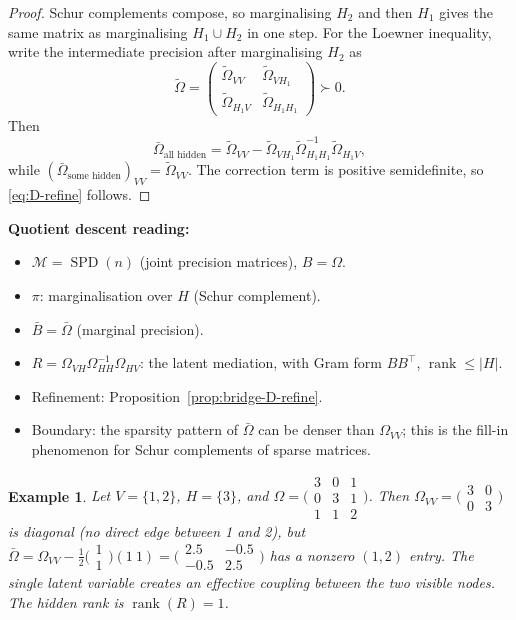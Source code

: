 \documentclass[11pt,a4paper]{article}
\numberwithin{equation}{section}
\DeclareMathOperator{\rank}{rank}
\DeclareMathOperator{\SPD}{SPD}
\theoremstyle{thmcompact}
\newtheorem{example}[theorem]{Example}
\theoremstyle{remark}
\begin{document}
\begin{proof}
Schur complements compose, so marginalising $H_2$ and then $H_1$ gives the same matrix as marginalising $H_1\cup H_2$ in one step. For the Loewner inequality, write the intermediate precision after marginalising $H_2$ as
\[
\widetilde\Omega=
\begin{pmatrix}
\widetilde\Omega_{VV} & \widetilde\Omega_{V H_1}\\
\widetilde\Omega_{H_1 V} & \widetilde\Omega_{H_1 H_1}
\end{pmatrix}\succ 0.
\]
Then
\[
\bar\Omega_{\text{all hidden}}=\widetilde\Omega_{VV}-\widetilde\Omega_{V H_1}\widetilde\Omega_{H_1H_1}^{-1}\widetilde\Omega_{H_1V},
\]
while $(\bar\Omega_{\text{some hidden}})_{VV}=\widetilde\Omega_{VV}$. The correction term is positive semidefinite, so \eqref{eq:D-refine} follows.
\end{proof}

\textbf{Quotient descent reading:}
\begin{itemize}[leftmargin=2em]
\item $\mathcal{M} = \SPD(n)$ (joint precision matrices), $B = \Omega$.
\item $\pi$: marginalisation over $H$ (Schur complement).
\item $\bar{B} = \bar{\Omega}$ (marginal precision).
\item $R = \Omega_{VH}\Omega_{HH}^{-1}\Omega_{HV}$: the latent mediation, with Gram form $BB^\top$, $\rank \leq |H|$.
\item Refinement: Proposition~\ref{prop:bridge-D-refine}.
\item Boundary: the sparsity pattern of $\bar{\Omega}$ can be denser than $\Omega_{VV}$; this is the fill-in phenomenon for Schur complements of sparse matrices.
\end{itemize}

\begin{example}\label{ex:bridge-D-toy}
Let $V = \{1, 2\}$, $H = \{3\}$, and $\Omega = \bigl(\begin{smallmatrix} 3 & 0 & 1 \\ 0 & 3 & 1 \\ 1 & 1 & 2 \end{smallmatrix}\bigr)$. Then $\Omega_{VV} = \bigl(\begin{smallmatrix} 3 & 0 \\ 0 & 3 \end{smallmatrix}\bigr)$ is diagonal (no direct edge between 1 and 2), but $\bar{\Omega} = \Omega_{VV} - \tfrac{1}{2}\bigl(\begin{smallmatrix} 1 \\ 1 \end{smallmatrix}\bigr)(1\ 1) = \bigl(\begin{smallmatrix} 2.5 & -0.5 \\ -0.5 & 2.5 \end{smallmatrix}\bigr)$ has a nonzero $(1,2)$ entry. The single latent variable creates an effective coupling between the two visible nodes. The hidden rank is $\rank(R) = 1$.
\end{example}
\end{document}

